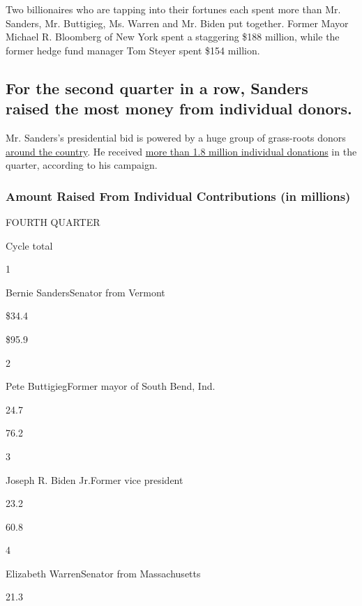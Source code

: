 Two billionaires who are tapping into their fortunes each spent more
than Mr. Sanders, Mr. Buttigieg, Ms. Warren and Mr. Biden put together.
Former Mayor Michael R. Bloomberg of New York spent a staggering \$188
million, while the former hedge fund manager Tom Steyer spent \$154
million.

\hypertarget{for-the-second-quarter-in-a-row-sanders-raised-the-most-money-from-individual-donors}{%
\subsection{For the second quarter in a row, Sanders raised the most
money from individual
donors.}\label{for-the-second-quarter-in-a-row-sanders-raised-the-most-money-from-individual-donors}}

Mr. Sanders's presidential bid is powered by a huge group of grass-roots
donors
\href{https://www.nytimes.com/interactive/2019/08/02/us/politics/2020-democratic-fundraising.html}{around
the country}. He received
\href{https://www.nytimes.com/2020/01/02/us/politics/bernie-sanders-q4-campaign-fundraising.html}{more
than 1.8 million individual donations} in the quarter, according to his
campaign.

\hypertarget{amount-raised-from-individual-contributions-in-millions}{%
\subsubsection{Amount Raised From Individual Contributions (in
millions)}\label{amount-raised-from-individual-contributions-in-millions}}

FOURTH QUARTER

Cycle total

1

Bernie SandersSenator from Vermont

\$34.4

\$95.9

2

Pete ButtigiegFormer mayor of South Bend, Ind.

24.7

76.2

3

Joseph R. Biden Jr.Former vice president

23.2

60.8

4

Elizabeth WarrenSenator from Massachusetts

21.3

